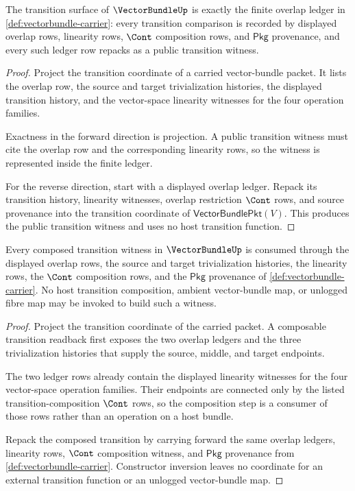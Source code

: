 \begin{theorem}
\label{thm:vectorbundle-transition-ledger-exactness}
The transition surface of $\VectorBundleUp$ is exactly the finite overlap
ledger in \autoref{def:vectorbundle-carrier}: every transition comparison is
recorded by displayed overlap rows, linearity rows, $\Cont$ composition rows,
and $\mathsf{Pkg}$ provenance, and every such ledger row repacks as a public
transition witness.
\end{theorem}
\begin{proof}
Project the transition coordinate of a carried vector-bundle packet. It lists
the overlap row, the source and target trivialization histories, the displayed
transition history, and the vector-space linearity witnesses for the four
operation families.

Exactness in the forward direction is projection. A public transition witness
must cite the overlap row and the corresponding linearity rows, so the witness
is represented inside the finite ledger.

For the reverse direction, start with a displayed overlap ledger. Repack its
transition history, linearity witnesses, overlap restriction $\Cont$ rows, and
source provenance into the transition coordinate of
$\mathsf{VectorBundlePkt}(V)$. This produces the public transition witness and
uses no host transition function.
\end{proof}

\begin{theorem}
\label{thm:vectorbundle-transition-composition-scope}
Every composed transition witness in $\VectorBundleUp$ is consumed through the
displayed overlap rows, the source and target trivialization histories, the
linearity rows, the $\Cont$ composition rows, and the $\mathsf{Pkg}$
provenance of \autoref{def:vectorbundle-carrier}. No host transition
composition, ambient vector-bundle map, or unlogged fibre map may be invoked
to build such a witness.
\end{theorem}
\begin{proof}
Project the transition coordinate of the carried packet. A composable
transition readback first exposes the two overlap ledgers and the three
trivialization histories that supply the source, middle, and target endpoints.

The two ledger rows already contain the displayed linearity witnesses for the
four vector-space operation families. Their endpoints are connected only by
the listed transition-composition $\Cont$ rows, so the composition step is a
consumer of those rows rather than an operation on a host bundle.

Repack the composed transition by carrying forward the same overlap ledgers,
linearity rows, $\Cont$ composition witness, and $\mathsf{Pkg}$ provenance
from \autoref{def:vectorbundle-carrier}. Constructor inversion leaves no
coordinate for an external transition function or an unlogged vector-bundle
map.
\end{proof}

